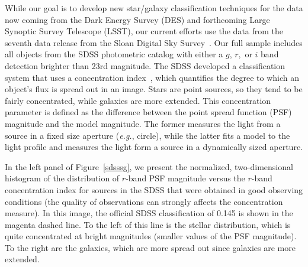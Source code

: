 While our goal is to develop new star/galaxy classification techniques for the data now coming from the Dark Energy Survey (DES) and forthcoming Large Synoptic Survey Telescope (LSST), our current efforts use the data from the seventh data release from the Sloan Digital Sky Survey~\citep{york00}. Our full sample includes all objects from the SDSS photometric catalog with either a $g$, $r,$ or $i$ band detection brighter than 23rd magnitude. The SDSS developed a classification system that uses a concentration index~\citep{scranton02}, which quantifies the degree to which an object's flux is spread out in an image. Stars are point sources, so they tend to be fairly concentrated, while galaxies are more extended. This concentration parameter is defined as the difference between the point spread function (PSF) magnitude and the model magnitude. The former measures the light from a source in a fixed size aperture (\textit{e.g.}, circle), while the latter fits a model to the light profile and measures the light form a source in a dynamically sized aperture. 

In the left panel of Figure~\ref{sdsssg}, we present the normalized, two-dimensional histogram of the distribution of $r$-band PSF magnitude versus the $r$-band concentration index for sources in the SDSS that were obtained in good observing conditions (the quality of observations can strongly affects the concentration measure). In this image, the official SDSS classification of 0.145 is shown in the magenta dashed line. To the left of this line is the stellar distribution, which is quite concentrated at bright magnitudes (smaller values of the PSF magnitude). To the right are the galaxies, which are more spread out since galaxies are more extended. 


